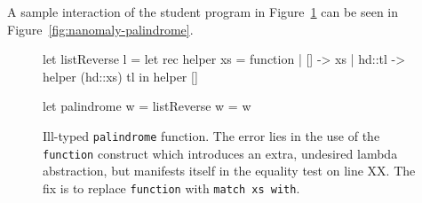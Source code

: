 A sample interaction of the student program in
Figure~\ref{fig:palindrome} can be seen in
Figure~\ref{fig:nanomaly-palindrome}.
%
\begin{figure}[ht]
\centering
\begin{code}
  let listReverse l =
    let rec helper xs = function
      | []     -> xs
      | hd::tl -> helper (hd::xs) tl
    in helper []

  let palindrome w =
    listReverse w = w
\end{code}
\caption{Ill-typed \texttt{palindrome} function. The error lies in the
  use of the \texttt{function} construct which introduces an extra,
  undesired lambda abstraction, but manifests itself in the equality
  test on line XX. The fix is to replace \texttt{function} with
  \texttt{match xs with}. }
\label{fig:palindrome}
\end{figure}
%
